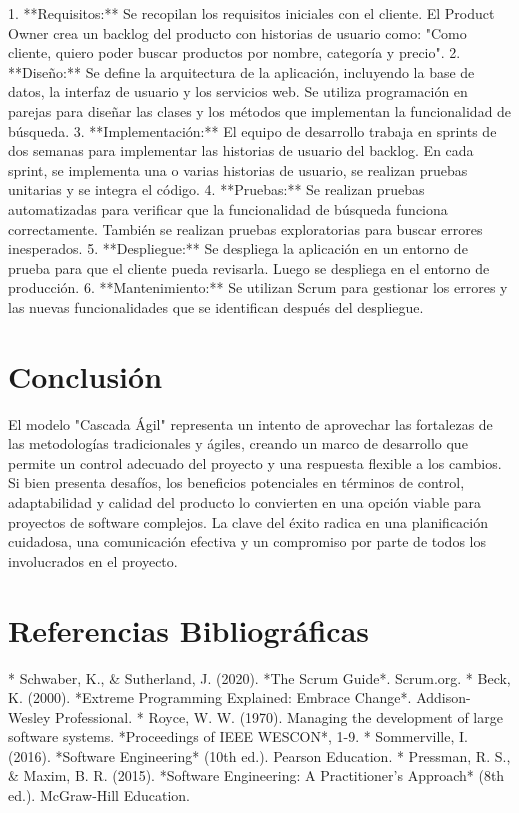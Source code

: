 \documentclass[12pt, spanish]{article}
\begin{document}
1.  **Requisitos:** Se recopilan los requisitos iniciales con el cliente.  El Product Owner crea un backlog del producto con historias de usuario como: "Como cliente, quiero poder buscar productos por nombre, categoría y precio".
2.  **Diseño:** Se define la arquitectura de la aplicación, incluyendo la base de datos, la interfaz de usuario y los servicios web.  Se utiliza programación en parejas para diseñar las clases y los métodos que implementan la funcionalidad de búsqueda.
3.  **Implementación:** El equipo de desarrollo trabaja en sprints de dos semanas para implementar las historias de usuario del backlog.  En cada sprint, se implementa una o varias historias de usuario, se realizan pruebas unitarias y se integra el código.
4.  **Pruebas:** Se realizan pruebas automatizadas para verificar que la funcionalidad de búsqueda funciona correctamente.  También se realizan pruebas exploratorias para buscar errores inesperados.
5.  **Despliegue:** Se despliega la aplicación en un entorno de prueba para que el cliente pueda revisarla.  Luego se despliega en el entorno de producción.
6.  **Mantenimiento:** Se utilizan Scrum para gestionar los errores y las nuevas funcionalidades que se identifican después del despliegue.

\section*{Conclusión}

El modelo "Cascada Ágil" representa un intento de aprovechar las fortalezas de las metodologías tradicionales y ágiles, creando un marco de desarrollo que permite un control adecuado del proyecto y una respuesta flexible a los cambios. Si bien presenta desafíos, los beneficios potenciales en términos de control, adaptabilidad y calidad del producto lo convierten en una opción viable para proyectos de software complejos. La clave del éxito radica en una planificación cuidadosa, una comunicación efectiva y un compromiso por parte de todos los involucrados en el proyecto.

\section*{Referencias Bibliográficas}

*   Schwaber, K., \& Sutherland, J. (2020). *The Scrum Guide*. Scrum.org.
*   Beck, K. (2000). *Extreme Programming Explained: Embrace Change*. Addison-Wesley Professional.
*   Royce, W. W. (1970). Managing the development of large software systems. *Proceedings of IEEE WESCON*, 1-9.
*   Sommerville, I. (2016). *Software Engineering* (10th ed.). Pearson Education.
*   Pressman, R. S., \& Maxim, B. R. (2015). *Software Engineering: A Practitioner's Approach* (8th ed.). McGraw-Hill Education.
\end{document}

